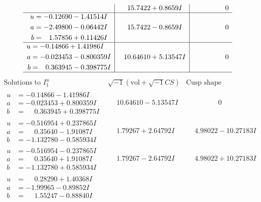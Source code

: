 \documentclass[1p]{elsarticle_modified}
\theoremstyle{definition}
\newcommand{\I}{\sqrt{-1}}
\begin{document}
$$\begin{array}{c|c|c}
 & \phantom{-}15.7422 + 0.8659 I & \phantom{-0.000000 } 0 \\ \hline\begin{aligned}
u &= -0.12690 - 1.41514 I \\
a &= -2.49800 - 0.06442 I \\
b &= \phantom{-}1.57856 + 0.11426 I\end{aligned}
 & \phantom{-}15.7422 - 0.8659 I & \phantom{-0.000000 } 0 \\ \hline\begin{aligned}
u &= -0.14866 + 1.41986 I \\
a &= -0.023453 - 0.800359 I \\
b &= \phantom{-}0.363945 - 0.398775 I\end{aligned}
 & \phantom{-}10.64610 + 5.13547 I & \phantom{-0.000000 } 0\\
 \hline 
 \end{array}$$\newpage$$\begin{array}{c|c|c}  
\text{Solutions to }I^u_{1}& \I (\text{vol} + \sqrt{-1}CS) & \text{Cusp shape}\\
 \hline 
\begin{aligned}
u &= -0.14866 - 1.41986 I \\
a &= -0.023453 + 0.800359 I \\
b &= \phantom{-}0.363945 + 0.398775 I\end{aligned}
 & \phantom{-}10.64610 - 5.13547 I & \phantom{-0.000000 } 0 \\ \hline\begin{aligned}
u &= -0.516954 + 0.237865 I \\
a &= \phantom{-}0.35640 - 1.91087 I \\
b &= -1.132780 - 0.585934 I\end{aligned}
 & \phantom{-}1.79267 + 2.64792 I & \phantom{-}4.98022 - 10.27183 I \\ \hline\begin{aligned}
u &= -0.516954 - 0.237865 I \\
a &= \phantom{-}0.35640 + 1.91087 I \\
b &= -1.132780 + 0.585934 I\end{aligned}
 & \phantom{-}1.79267 - 2.64792 I & \phantom{-}4.98022 + 10.27183 I \\ \hline\begin{aligned}
u &= \phantom{-}0.28290 + 1.40368 I \\
a &= -1.99965 - 0.89852 I \\
b &= \phantom{-}1.55247 - 0.88840 I\end{aligned}

\end{array}$$
\end{document}
